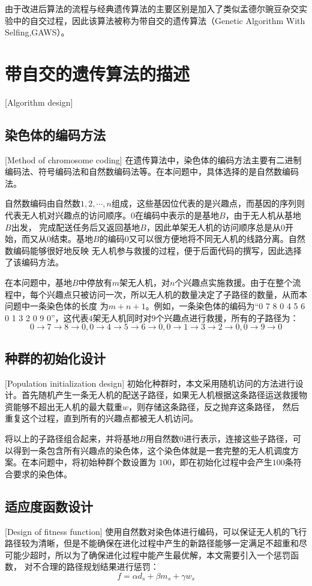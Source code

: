 由于改进后算法的流程与经典遗传算法的主要区别是加入了类似孟德尔豌豆杂交实验中的自交过程，因此该算法被称为带自交的遗传算法（Genetic Algorithm With Selfing,GAWS）。
\section{带自交的遗传算法的描述}[Algorithm design]

\subsection{染色体的编码方法}[Method of chromosome coding]
在遗传算法中，染色体的编码方法主要有二进制编码法、符号编码法和自然数编码法等。在本问题中，具体选择的是自然数编码法。


自然数编码由自然数$1,2,\cdots,n$组成，这些基因位代表的是兴趣点，而基因的序列则代表无人机对兴趣点的访问顺序。$0$在编码中表示的是基地$B$，由于无人机从基地$B$出发，
完成配送任务后又返回基地$B$，因此单架无人机的访问顺序总是从$0$开始，而又从$0$结束。基地$B$的编码$0$又可以很方便地将不同无人机的线路分离。自然数编码能够很好地反映
无人机参与救援的过程，便于后面代码的撰写，因此选择了该编码方法。


在本问题中，基地$B$中停放有$m$架无人机，对$n$个兴趣点实施救援。由于在整个流程中，每个兴趣点只被访问一次，所以无人机的数量决定了子路径的数量，从而本问题中一条染色体的长度
为$m+n+1$。例如，一条染色体的编码为``0 7 8 0 4 5 6 0 1 3 2 0 9 0''，这代表$4$架无人机同时对$9$个兴趣点进行救援，所有的子路径为：
$$0\rightarrow7\rightarrow8\rightarrow0,0\rightarrow4\rightarrow5\rightarrow6\rightarrow0,0\rightarrow1\rightarrow3\rightarrow2\rightarrow0,0\rightarrow9\rightarrow0$$

\subsection{种群的初始化设计}[Population initialization design]
初始化种群时，本文采用随机访问的方法进行设计。首先随机产生一条无人机的配送子路径，如果无人机根据这条路径运送救援物资能够不超出无人机的最大载重$w$，则存储这条路径，反之抛弃这条路径，
然后重复这个过程，直到所有的兴趣点都被无人机访问。


将以上的子路径组合起来，并将基地$B$用自然数$0$进行表示，连接这些子路径，可以得到一条包含所有兴趣点的染色体，这个染色体就是一套完整的无人机调度方案。在本问题中，将初始种群个数设置为
$100$，即在初始化过程中会产生$100$条符合要求的染色体。

\subsection{适应度函数设计}[Design of fitness function]
使用自然数对染色体进行编码，可以保证无人机的飞行路径较为清晰，但是不能确保在进化过程中产生的新路径能够一定满足不超重和尽可能少超时，所以为了确保进化过程中能产生最优解，本文需要引入一个惩罚函数，
对不合理的路径规划结果进行惩罚：
\begin{equation}
	f= \alpha d_s + \beta m_s + \gamma w_s
\end{equation}

